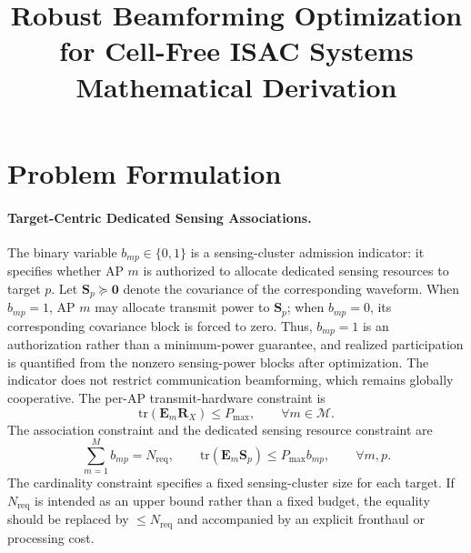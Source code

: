 \documentclass[12pt,a4paper]{article}
\title{\textbf{Robust Beamforming Optimization for Cell-Free ISAC Systems\\Mathematical Derivation}}
\author{}
\date{}
\newcommand{\mat}[1]{\mathbf{#1}}
\newcommand{\tr}{\text{tr}}
\begin{document}
\maketitle

\section{Problem Formulation}\label{sec:formulation}

\paragraph{Target-Centric Dedicated Sensing Associations.}
The binary variable $b_{mp}\in\{0,1\}$ is a sensing-cluster admission indicator: it specifies whether AP $m$ is authorized to allocate dedicated sensing resources to target $p$. Let $\mat{S}_p\succeq\mat{0}$ denote the covariance of the corresponding waveform. When $b_{mp}=1$, AP $m$ may allocate transmit power to $\mat{S}_p$; when $b_{mp}=0$, its corresponding covariance block is forced to zero. Thus, $b_{mp}=1$ is an authorization rather than a minimum-power guarantee, and realized participation is quantified from the nonzero sensing-power blocks after optimization. The indicator does not restrict communication beamforming, which remains globally cooperative. The per-AP transmit-hardware constraint is
\begin{equation}
    \tr(\mat{E}_m\mat{R}_X)\leq P_{\max},\qquad \forall m\in\mathcal{M}.
\end{equation}
The association constraint and the dedicated sensing resource constraint are
\begin{equation}
\sum_{m=1}^{M}b_{mp}=N_{\mathrm{req}},\qquad
\tr(\mat{E}_m\mat{S}_p)\leq P_{\max}b_{mp},\qquad \forall m,p.
\end{equation}
The cardinality constraint specifies a fixed sensing-cluster size for each target. If $N_{\mathrm{req}}$ is intended as an upper bound rather than a fixed budget, the equality should be replaced by $\leq N_{\mathrm{req}}$ and accompanied by an explicit fronthaul or processing cost.
\end{document}
